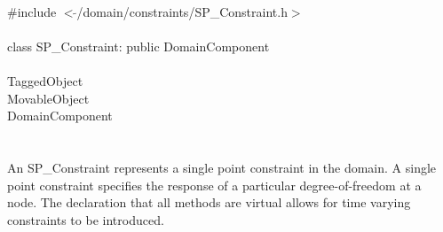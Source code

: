 
   \\
\indent \#include $<\tilde{ }$/domain/constraints/SP\_Constraint.h$>$  \\

  \\
\indent class SP\_Constraint: public DomainComponent \\

 \\
\indent TaggedObject \\
\indent MovableObject \\
\indent\indent DomainComponent \\
\indent\indent{} \\

  \\
\indent An SP\_Constraint represents a single point constraint in the
domain. A single point constraint specifies the response of a particular
degree-of-freedom at a node. The declaration that all methods are
virtual allows for time varying constraints to be introduced. \\

